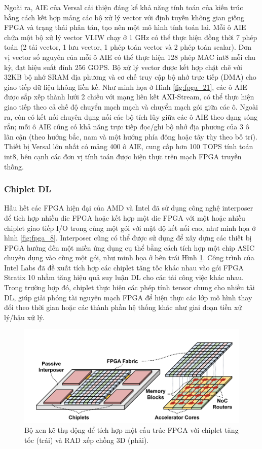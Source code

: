 \documentclass[a4paper]{article}
\begin{document}
Ngoài ra, AIE của Versal cải thiện đáng kể khả năng tính toán của kiến trúc bằng cách kết hợp mảng các bộ xử lý vector với định tuyến không gian giống FPGA và trạng thái phân tán, tạo nên một mô hình tính toán lai. Mỗi ô AIE chứa một bộ xử lý vector VLIW chạy ở 1 GHz có thể thực hiện đồng thời 7 phép toán (2 tải vector, 1 lưu vector, 1 phép toán vector và 2 phép toán scalar). Đơn vị vector số nguyên của mỗi ô AIE có thể thực hiện 128 phép MAC int8 mỗi chu kỳ, đạt hiệu suất đỉnh 256 GOPS. Bộ xử lý vector được kết hợp chặt chẽ với 32KB bộ nhớ SRAM địa phương và cơ chế truy cập bộ nhớ trực tiếp (DMA) cho giao tiếp dữ liệu không liền kề. Như minh họa ở Hình \ref{fig:fpga_21}, các ô AIE được sắp xếp thành lưới 2 chiều với mạng liên kết AXI-Stream, có thể thực hiện giao tiếp theo cả chế độ chuyển mạch mạch và chuyển mạch gói giữa các ô. Ngoài ra, còn có kết nối chuyên dụng nối các bộ tích lũy giữa các ô AIE theo dạng sóng rắn; mỗi ô AIE cũng có khả năng trực tiếp đọc/ghi bộ nhớ địa phương của 3 ô lân cận (theo hướng bắc, nam và một hướng phía đông hoặc tây tùy theo bố trí). Thiết bị Versal lớn nhất có mảng 400 ô AIE, cung cấp hơn 100 TOPS tính toán int8, bên cạnh các đơn vị tính toán được hiện thực trên mạch FPGA truyền thống.

\subsubsection{Chiplet DL}
Hầu hết các FPGA hiện đại của AMD và Intel đã sử dụng công nghệ interposer để tích hợp nhiều die FPGA hoặc kết hợp một die FPGA với một hoặc nhiều chiplet giao tiếp I/O trong cùng một gói với mật độ kết nối cao, như minh họa ở hình \ref{fig:fpga_8}. Interposer cũng có thể được sử dụng để xây dựng các thiết bị FPGA hướng đến một miền ứng dụng cụ thể bằng cách tích hợp một chip ASIC chuyên dụng vào cùng một gói, như minh họa ở bên trái Hình \ref{fig:fpga_23}. Công trình của Intel Labs đã đề xuất tích hợp các chiplet tăng tốc khác nhau vào gói FPGA Stratix 10 nhằm tăng hiệu quả suy luận DL cho các tải công việc khác nhau. Trong trường hợp đó, chiplet thực hiện các phép tính tensor chung cho nhiều tải DL, giúp giải phóng tài nguyên mạch FPGA để hiện thực các lớp mô hình thay đổi theo thời gian hoặc các thành phần hệ thống khác như giai đoạn tiền xử lý/hậu xử lý.
\begin{figure} [!h]
    \centering
    \includegraphics[width=0.75\linewidth]{assets/fpga_23.png}
    \caption{Bộ xen kẽ thụ động để tích hợp một cấu trúc FPGA với
chiplet tăng tốc (trái) và RAD xếp chồng 3D (phải).}
    \label{fig:fpga_23}
\end{figure}
\end{document}
